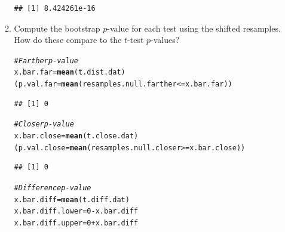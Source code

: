 \documentclass{article}\usepackage[]{graphicx}\usepackage[]{xcolor}
\makeatletter
\newcommand{\hlnum}[1]{\textcolor[rgb]{0.686,0.059,0.569}{#1}}%
\newcommand{\hlcom}[1]{\textcolor[rgb]{0.678,0.584,0.686}{\textit{#1}}}%
\newcommand{\hlopt}[1]{\textcolor[rgb]{0,0,0}{#1}}%
\newcommand{\hldef}[1]{\textcolor[rgb]{0.345,0.345,0.345}{#1}}%
\newcommand{\hlkwb}[1]{\textcolor[rgb]{0.69,0.353,0.396}{#1}}%
\newcommand{\hlkwd}[1]{\textcolor[rgb]{0.737,0.353,0.396}{\textbf{#1}}}%
\newenvironment{kframe}{%
 \def\at@end@of@kframe{}%
 \ifinner\ifhmode%
  \def\at@end@of@kframe{\end{minipage}}%
  \begin{minipage}{\columnwidth}%
 \fi\fi%
 \def\FrameCommand##1{\hskip\@totalleftmargin \hskip-\fboxsep
 \colorbox{shadecolor}{##1}\hskip-\fboxsep
     \hskip-\linewidth \hskip-\@totalleftmargin \hskip\columnwidth}%
 \MakeFramed {\advance\hsize-\width
   \@totalleftmargin\z@ \linewidth\hsize
   \@setminipage}}%
 {\par\unskip\endMakeFramed%
 \at@end@of@kframe}
\newenvironment{knitrout}{}{} %
\makeatother
\begin{document}
\begin{enumerate}
\begin{enumerate}
\begin{knitrout}
\begin{kframe}
\begin{alltt}
\end{alltt}
\begin{verbatim}
## [1] 8.424261e-16
\end{verbatim}
\end{kframe}
\end{knitrout}
  \item Compute the bootstrap $p$-value for each test using the shifted resamples. 
  How do these compare to the $t$-test $p$-values?
\begin{knitrout}\scriptsize
{}\color{fgcolor}\begin{kframe}
\begin{alltt}
\hlcom{#Farther p-value}
\hldef{x.bar.far} \hlkwb{=} \hlkwd{mean}\hldef{(t.dist.dat)}
\hldef{(p.val.far} \hlkwb{=} \hlkwd{mean}\hldef{(resamples.null.farther} \hlopt{<=} \hldef{x.bar.far))}
\end{alltt}
\begin{verbatim}
## [1] 0
\end{verbatim}
\begin{alltt}
\hlcom{#Closer p-value}
\hldef{x.bar.close} \hlkwb{=} \hlkwd{mean}\hldef{(t.close.dat)}
\hldef{(p.val.close} \hlkwb{=} \hlkwd{mean}\hldef{(resamples.null.closer} \hlopt{>=}\hldef{x.bar.close))}
\end{alltt}
\begin{verbatim}
## [1] 0
\end{verbatim}
\begin{alltt}
\hlcom{#Difference p-value}
\hldef{x.bar.diff} \hlkwb{=} \hlkwd{mean}\hldef{(t.diff.dat)}
\hldef{x.bar.diff.lower} \hlkwb{=} \hlnum{0}\hlopt{-}\hldef{x.bar.diff}
\hldef{x.bar.diff.upper} \hlkwb{=} \hlnum{0}\hlopt{+}\hldef{x.bar.diff}


\end{alltt}
\end{kframe}
\end{knitrout}
\end{enumerate}
\end{enumerate}
\end{document}
